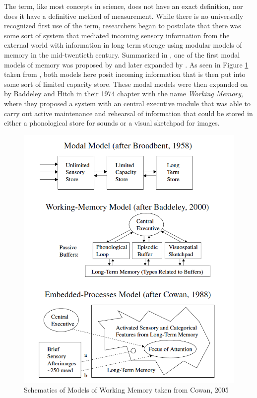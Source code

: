 \documentclass[12pt,]{book}
\begin{document}
The term, like most concepts in science, does not have an exact definition, nor does it have a definitive method of measurement.
While there is no universally recognized first use of the term, researchers began to postulate that there was some sort of system that mediated incoming sensory information from the external world with information in long term storage using modular models of memory in the mid-twentieth century.
Summarized in \citet{cowanWorkingMemoryCapacity2005}, one of the first modal models of memory was proposed by \citet{broadbentPerceptionCommunication1958} and later expanded by \citet{atkinsonHUMANMEMORYPROPOSED1968}.
As seen in Figure \ref{fig:wmmodels} taken from \citet{cowanWorkingMemoryCapacity2005}, both models here posit incoming information that is then put into some sort of limited capacity store.
These modal models were then expanded on by Baddeley and Hitch \citep{baddeleyWorkingMemory1974} in their 1974 chapter with the name \emph{Working Memory}, where they proposed a system with an central executive module that was able to carry out active maintenance and rehearsal of information that could be stored in either a phonological store for sounds or a visual sketchpad for images.

\begin{figure}

{\centering \includegraphics[width=1\linewidth]{img/wm_models} 

}

\caption{Schematics of Models of Working Memory taken from Cowan, 2005}\label{fig:wmmodels}
\end{figure}
\end{document}
